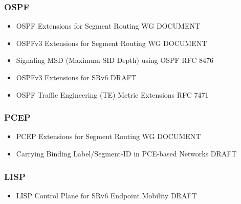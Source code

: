 {\subsubsection{OSPF}
\begin{itemize}
    \item OSPF Extensions for Segment Routing WG DOCUMENT \cite{ietf-ospf-segment-routing-extensions}
    \item OSPFv3 Extensions for Segment Routing WG DOCUMENT \cite{ietf-ospf-ospfv3-segment-routing-extensions}
    \item Signaling MSD (Maximum SID Depth) using OSPF RFC 8476 \cite{rfc8476}
    \item OSPFv3 Extensions for SRv6 DRAFT \cite{li-ospf-ospfv3-srv6-extensions}
    \item OSPF Traffic Engineering (TE) Metric Extensions RFC 7471 \cite{rfc7471}
\end{itemize}    
\subsubsection{PCEP}
\begin{itemize}
    \item PCEP Extensions for Segment Routing WG DOCUMENT \cite{ietf-pce-segment-routing}
    \item Carrying Binding Label/Segment-ID in PCE-based Networks DRAFT \cite{sivabalan-pce-binding-label-sid}
\end{itemize}    
\subsubsection{LISP}
\begin{itemize}
    \item LISP Control Plane for SRv6 Endpoint Mobility DRAFT \cite{rodrigueznatal-lisp-srv6}
\end{itemize}} 